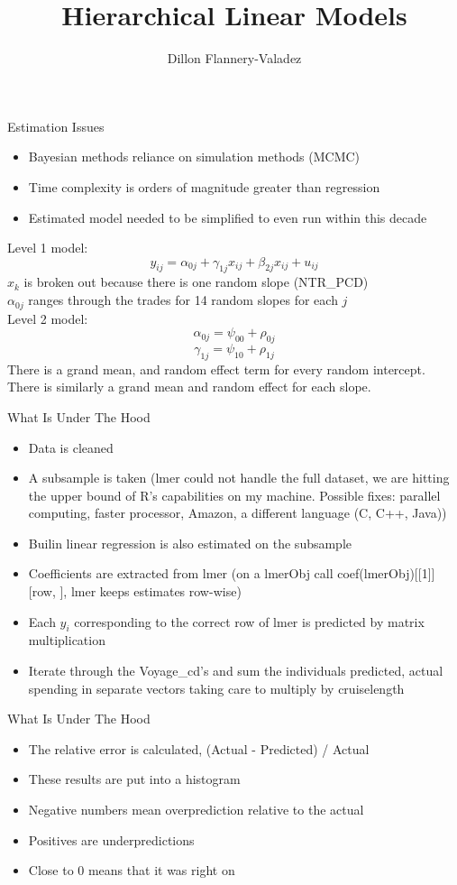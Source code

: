 \documentclass{beamer}
\title{Hierarchical Linear Models}
\author{Dillon Flannery-Valadez}
\institute{Holland America}
\begin{document}
	
\titlepage


\begin{frame}{Estimation Issues}
\begin{itemize}
	\item Bayesian methods reliance on simulation methods (MCMC)
	\item Time complexity is orders of magnitude greater than regression
	\item Estimated model needed to be simplified to even run within this decade
\end{itemize}
Level 1 model:
\[ y_{ij} = \alpha_{0j} + \gamma_{1j} x_{ij} + \beta_{2j} x_{ij} + u_{ij} \]
$ x_k $ is broken out because there is one random slope (NTR\_PCD) \\
$ \alpha_{0j} $  ranges through the trades for 14 random slopes for each $ j $ \\
Level 2 model:
\[ \alpha_{0j} = \psi_{00} +  \rho_{0j} \] 
\[ \gamma_{1j} = \psi_{10} + \rho_{1j} \]
There is a grand mean, and random effect term for every random intercept. \\
There is similarly a grand mean and random effect for each slope. 
\end{frame}

\begin{frame}{What Is Under The Hood}
	\begin{itemize}
		\item Data is cleaned
		\item A subsample is taken (lmer could not handle the full dataset, we are hitting the upper bound of R's capabilities on my machine. Possible fixes: parallel computing, faster processor, Amazon, a different language (C, C++, Java))
		\item Builin linear regression is also estimated on the subsample
		\item Coefficients are extracted from lmer (on a lmerObj call coef(lmerObj)[[1]][row, ], lmer keeps estimates row-wise)
		\item Each $ y_i $ corresponding to the correct row of lmer is predicted by matrix multiplication
		\item Iterate through the Voyage\_cd's and sum the individuals predicted, actual spending in separate vectors taking care to multiply by cruiselength
	\end{itemize}
\end{frame}

\begin{frame}{What Is Under The Hood}
	\begin{itemize}
	\item The relative error is calculated, (Actual - Predicted) / Actual
	\item These results are put into a histogram
	\item Negative numbers mean overprediction relative to the actual
	\item Positives are underpredictions
	\item Close to 0 means that it was right on
	\end{itemize}
\end{frame}
\end{document}
